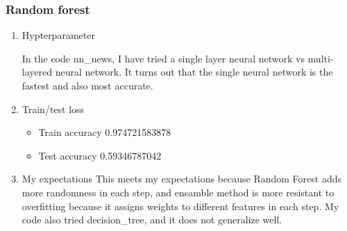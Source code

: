 \documentclass[letterpaper, 12]{article}
\begin{document}
\subsubsection{Random forest}
\begin{enumerate}

    \item Hypterparameter
	
	In the code nn\_news, I have tried a single layer neural network vs multi-layered neural network. It turns out that the single neural network is the fastest and also most accurate.

	\item Train/test loss
	\begin{itemize}
     \item  Train accuracy 0.974721583878
     \item Test accuracy 0.59346787042
        \end{itemize}
      \item My expectations
      This meets my expectations because Random Forest adds more randomness in each step, and ensamble method is more resistant to overfitting because it assigns weights to different features in each step. My code also tried decision\_tree, and it does not generalize well.
  
\end{enumerate}
\end{document}
